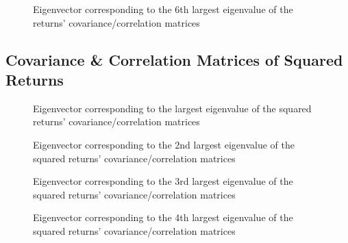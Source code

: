\documentclass{article}
\begin{document}
\begin{figure}[htb!]
  \centering
  \caption{Eigenvector corresponding to the 6th largest eigenvalue of the returns' covariance/correlation matrices}
\end{figure}


\pagebreak
\subsection{Covariance \& Correlation Matrices of Squared Returns}

\begin{figure}[htb!]
  \centering
  \caption{Eigenvector corresponding to the largest eigenvalue of the squared returns' covariance/correlation matrices}
\end{figure}

\begin{figure}[htb!]
  \centering
  \caption{Eigenvector corresponding to the 2nd largest eigenvalue of the squared returns' covariance/correlation matrices}
\end{figure}

\begin{figure}[htb!]
  \centering
  \caption{Eigenvector corresponding to the 3rd largest eigenvalue of the squared returns' covariance/correlation matrices}
\end{figure}

\begin{figure}[htb!]
  \centering
  \caption{Eigenvector corresponding to the 4th largest eigenvalue of the squared returns' covariance/correlation matrices}
\end{figure}
\end{document}
